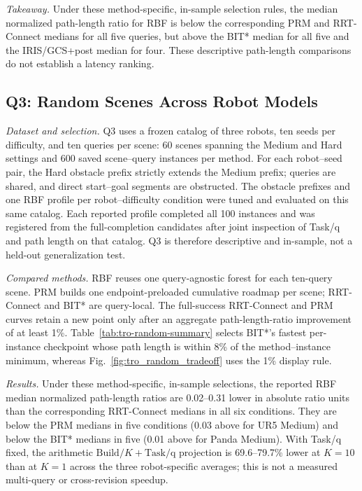 \documentclass[journal]{IEEEtran}
\newcommand{\rbf}{RBF}
\begin{document}
\noindent\emph{Takeaway.}
Under these method-specific, in-sample selection rules, the median normalized
path-length ratio for \rbf{} is below the corresponding PRM and RRT-Connect
medians for all five queries, but above the BIT* median for all five and the
IRIS/GCS+post median for four. These descriptive path-length comparisons do not
establish a latency ranking.

\subsection{Q3: Random Scenes Across Robot Models}
\label{sec:exp_generalization}

\emph{Dataset and selection.}
Q3 uses a frozen catalog of three robots, ten seeds per difficulty, and ten
queries per scene: 60 scenes spanning the Medium and Hard settings and 600 saved
scene--query instances per method. For each robot--seed pair, the Hard obstacle
prefix strictly extends the Medium prefix; queries are shared, and direct
start--goal segments are obstructed. The obstacle prefixes and one \rbf{} profile
per robot--difficulty condition were tuned and evaluated on this same catalog.
Each reported profile completed all 100 instances and was registered
from the full-completion candidates after joint inspection of Task/q and path
length on that catalog. Q3 is therefore descriptive and in-sample, not a
held-out generalization test.

\emph{Compared methods.}
\rbf{} reuses one query-agnostic forest for each ten-query scene. PRM builds one
endpoint-preloaded cumulative roadmap per scene; RRT-Connect and BIT* are
query-local. The full-success RRT-Connect and PRM curves retain a new point only
after an aggregate path-length-ratio improvement of at least 1\%.
Table~\ref{tab:tro-random-summary}
selects BIT*'s fastest per-instance checkpoint whose path length is within 8\%
of the method--instance minimum, whereas Fig.~\ref{fig:tro_random_tradeoff}
uses the 1\% display rule.

\emph{Results.}
Under these method-specific, in-sample selections, the reported \rbf{} median
normalized path-length ratios are 0.02--0.31 lower in absolute ratio units than
the corresponding RRT-Connect medians in all six conditions. They are below the
PRM medians in five conditions (0.03 above for UR5 Medium) and below the BIT*
medians in five (0.01 above for Panda Medium). With Task/q fixed, the arithmetic
$\mathrm{Build}/K+\mathrm{Task/q}$ projection is 69.6--79.7\% lower at $K=10$
than at $K=1$ across the three robot-specific averages; this is not a measured
multi-query or cross-revision speedup.
\end{document}
